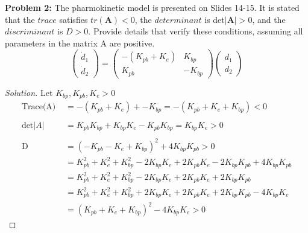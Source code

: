 \documentclass[12pt]{article}
\begin{document}
\noindent \textbf{Problem 2: }The pharmokinetic model is presented on Slides 14-15. It is stated that the $trace$ satisfies
$tr(\textbf{A}) < 0$, the $determinant$ is det$|\textbf{A}| > 0$, and the $discriminant$ is $D > 0$. Provide details that
verify these conditions, assuming all parameters in the matrix A are positive.
$$
	\begin{pmatrix}
		\dot{d}_1 \\
		\dot{d}_2
	\end{pmatrix} = 
	\begin{pmatrix}
		-(K_{pb} + K_e) & K_{bp} \\
		K_{pb} &  -K_{bp}
	\end{pmatrix} 
	\begin{pmatrix}
		d_1 \\
		d_2
	\end{pmatrix}
$$
\begin{proof}[Solution]
	Let $K_{bp}, K_{pb}, K_e > 0$
	\begin{align*}
		\text{Trace(A) }&= -(K_{pb} + K_e) + -K_{bp} = -(K_{pb} + K_e + K_{bp}) < 0 \\ \\
		\text{det$|A|$ }&= K_{pb}K_{bp} + K_{bp}K_e - K_{pb}K_{bp} = K_{bp}K_e > 0 \\ \\
		\text{D }&= (-K_{pb} - K_e + K_{bp})^2 + 4K_{bp}K_{pb} > 0\\
		&= K_{pb}^2 + K_e^2 + K_{bp}^2 - 2K_{bp}K_e + 2K_{pb}K_e - 2K_{bp}K_{pb} + 4K_{bp}K_{pb} \\
		&= K_{pb}^2 + K_e^2 + K_{bp}^2 - 2K_{bp}K_e + 2K_{pb}K_e + 2K_{bp}K_{pb} \\
		&= K_{pb}^2 + K_e^2 + K_{bp}^2 + 2K_{bp}K_e + 2K_{pb}K_e + 2K_{bp}K_{pb} - 4K_{bp}K_e \\
		&= (K_{pb} + K_e + K_{bp})^2 - 4K_{bp}K_e > 0
	\end{align*}
\end{proof}

\newpage
\end{document}
